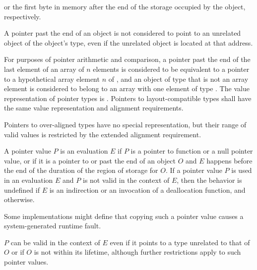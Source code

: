 or the first byte in memory
after the end of the storage occupied by the object,
respectively.
\begin{note}
A pointer past the end of an object
is not considered to point to an unrelated object
of the object's type,
even if the unrelated object is located at that address.
\end{note}
For purposes of pointer arithmetic
and comparison,
a pointer past the end of the last element of
an array  of $n$ elements
is considered to be equivalent to
a pointer to a hypothetical array element $n$ of , and
an object of type  that is not an array element
is considered to belong to an array with one element of type .
The value representation of
pointer types is . Pointers to
layout-compatible types shall
have the same value representation and alignment
requirements.
\begin{note}
Pointers to over-aligned types have no special
representation, but their range of valid values is restricted by the extended
alignment requirement.
\end{note}

\pnum
A pointer value $P$ is
%
 an evaluation $E$
if $P$ is a pointer to function or a null pointer value, or
if it is a pointer to or past the end of an object $O$ and
$E$ happens before the end of the duration of the region of storage for $O$.
If a pointer value $P$ is used in an evaluation $E$ and
$P$ is not valid in the context of $E$,
then the behavior is undefined if $E$ is
an indirection or
an invocation of a deallocation function,
and  otherwise.
\begin{footnote}
Some implementations might define that
copying such a pointer value causes a system-generated runtime fault.
\end{footnote}
\begin{note}
$P$ can be valid in the context of $E$ even
if it points to a type unrelated to that of $O$ or
if $O$ is not within its lifetime,
although further restrictions apply
to such pointer values.
\end{note}

